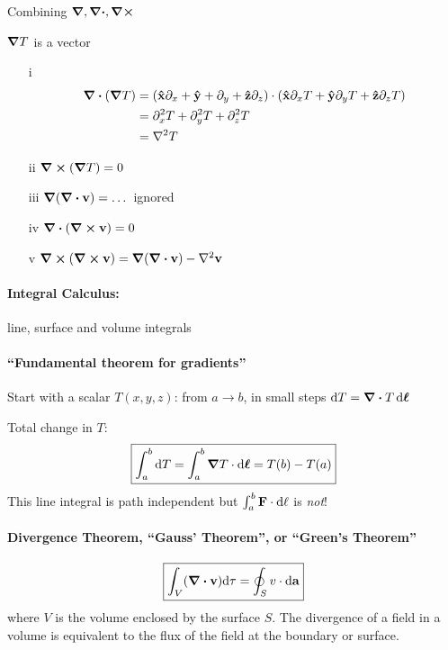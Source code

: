 \documentclass[../main.tex]{subfiles}
\begin{document}
Combining $\grad, \div, \curl$

$\grad T$ is a vector

\begin{enumerate}
    \item[i] 
    \begin{align*}
        \div(\grad T) &= (\vu x \partial_x + \vu y + \partial_y + \vu z \partial_z) \cdot (\vu x \partial_x T + \vu y \partial_y T + \vu z \partial_z T) \\
        &= \partial_x^2 T + \partial_y^2 T + \partial_z^2 T \\
        &= \laplacian T
    \end{align*}
    \item[ii] $\curl (\grad T) = 0$
    \item[iii] $\grad(\div \vb v) = \dots$ ignored
    \item[iv] $\div(\curl \vb v) = 0$
    \item[v] $\curl(\curl \vb v) = \grad(\div \vb v) - \laplacian \vb v$
\end{enumerate}

\paragraph*{Integral Calculus:}

line, surface and volume integrals

\paragraph*{``Fundamental theorem for gradients''}

Start with a scalar $T(x,y,z)$: from $a \to b$, in small steps $\dd{T} = \div T \dd{\vb*\ell}$

Total change in $T$:
\begin{align*}
    \boxed{\int_a^b \dd T = \int_a^b \grad T \cdot \dd{\vb*\ell} = T(b) - T(a)} 
\end{align*}
This line integral is path independent but $\int_a^b \vb F \cdot \dd{\vb \ell}$ is \emph{not}!

\paragraph*{Divergence Theorem, ``Gauss' Theorem'', or ``Green's Theorem''}

\begin{align*}
    \boxed{
        \int_V (\div \vb v) \dd \tau = \oint_S \vb \vb v \cdot \dd{\vb a}
    }
\end{align*}
where $V$ is the volume enclosed by the surface $S$. The divergence of a field in a volume is equivalent to the flux of the field at the boundary or surface.
\end{document}
